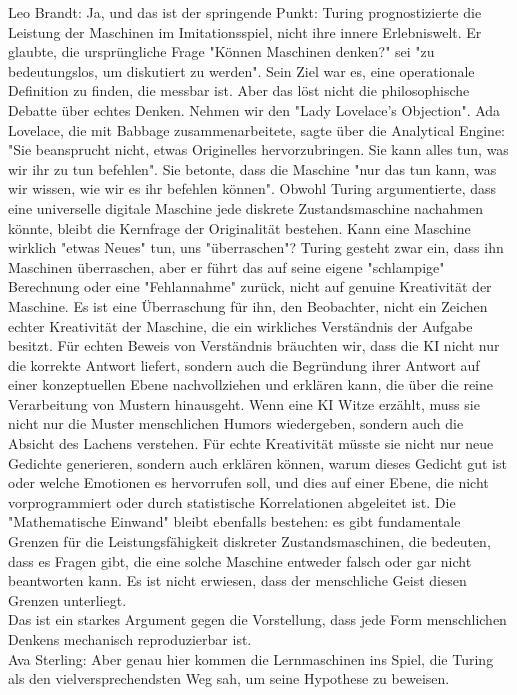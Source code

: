\documentclass[a4paper,12pt]{scrartcl}
\begin{document}
Leo Brandt: Ja, und das ist der springende Punkt: Turing prognostizierte die Leistung der Maschinen im Imitationsspiel, nicht ihre innere Erlebniswelt. Er glaubte, die ursprüngliche Frage "Können Maschinen denken?" sei "zu bedeutungslos, um diskutiert zu werden". Sein Ziel war es, eine operationale Definition zu finden, die messbar ist. Aber das löst nicht die philosophische Debatte über echtes Denken. Nehmen wir den "Lady Lovelace's Objection". Ada Lovelace, die mit Babbage zusammenarbeitete, sagte über die Analytical Engine: "Sie beansprucht nicht, etwas Originelles hervorzubringen. Sie kann alles tun, was wir ihr zu tun befehlen". Sie betonte, dass die Maschine "nur das tun kann, was wir wissen, wie wir es ihr befehlen können". Obwohl Turing argumentierte, dass eine universelle digitale Maschine jede diskrete Zustandsmaschine nachahmen könnte, bleibt die Kernfrage der Originalität bestehen. Kann eine Maschine wirklich "etwas Neues" tun, uns "überraschen"? Turing gesteht zwar ein, dass ihn Maschinen überraschen, aber er führt das auf seine eigene "schlampige" Berechnung oder eine "Fehlannahme" zurück, nicht auf genuine Kreativität der Maschine. Es ist eine Überraschung für ihn, den Beobachter, nicht ein Zeichen echter Kreativität der Maschine, die ein wirkliches Verständnis der Aufgabe besitzt. Für echten Beweis von Verständnis bräuchten wir, dass die KI nicht nur die korrekte Antwort liefert, sondern auch die Begründung ihrer Antwort auf einer konzeptuellen Ebene nachvollziehen und erklären kann, die über die reine Verarbeitung von Mustern hinausgeht. Wenn eine KI Witze erzählt, muss sie nicht nur die Muster menschlichen Humors wiedergeben, sondern auch die Absicht des Lachens verstehen. Für echte Kreativität müsste sie nicht nur neue Gedichte generieren, sondern auch erklären können, warum dieses Gedicht gut ist oder welche Emotionen es hervorrufen soll, und dies auf einer Ebene, die nicht vorprogrammiert oder durch statistische Korrelationen abgeleitet ist. Die "Mathematische Einwand" bleibt ebenfalls bestehen: es gibt fundamentale Grenzen für die Leistungsfähigkeit diskreter Zustandsmaschinen, die bedeuten, dass es Fragen gibt, die eine solche Maschine entweder falsch oder gar nicht beantworten kann. Es ist nicht erwiesen, dass der menschliche Geist diesen Grenzen unterliegt.\\
Das ist ein starkes Argument gegen die Vorstellung, dass jede Form menschlichen Denkens mechanisch reproduzierbar ist.\\
Ava Sterling: Aber genau hier kommen die Lernmaschinen ins Spiel, die Turing als den vielversprechendsten Weg sah, um seine Hypothese zu beweisen.\\
\end{document}
